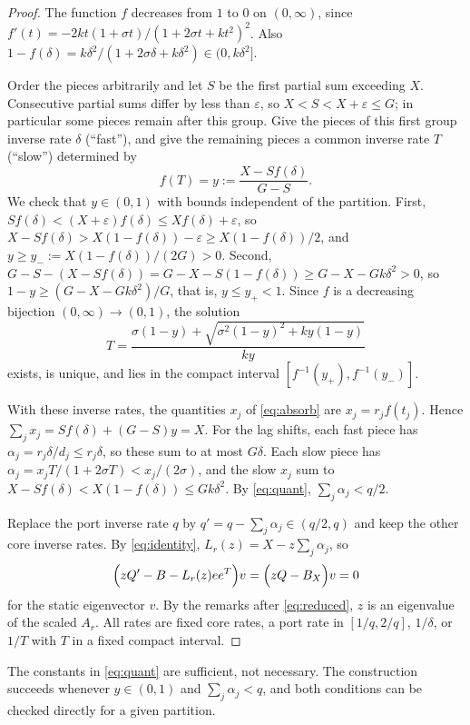 \documentclass[11pt,a4paper]{article}
\theoremstyle{plain}
\theoremstyle{definition}
\theoremstyle{remark}
\begin{document}
\begin{proof}
The function $f$ decreases from $1$ to $0$ on $(0,\infty)$, since
$f'(t)=-2kt(1+\sigma t)/(1+2\sigma t+kt^2)^2$. Also
$1-f(\delta)=k\delta^2/(1+2\sigma\delta+k\delta^2)\in(0,k\delta^2]$.

Order the pieces arbitrarily and let $S$ be the first partial sum exceeding
$X$. Consecutive partial sums differ by less than $\varepsilon$, so
$X<S<X+\varepsilon\le G$; in particular some pieces remain after this group.
Give the pieces of this first group inverse rate $\delta$ (``fast''), and give
the remaining pieces a common inverse rate $T$ (``slow'') determined by
\begin{equation}\label{eq:T}
 f(T)=y:=\frac{X-Sf(\delta)}{G-S}.
\end{equation}
We check that $y\in(0,1)$ with bounds independent of the partition. First,
$Sf(\delta)<(X+\varepsilon)f(\delta)\le Xf(\delta)+\varepsilon$, so
$X-Sf(\delta)>X(1-f(\delta))-\varepsilon\ge X(1-f(\delta))/2$, and
$y\ge y_-:=X(1-f(\delta))/(2G)>0$. Second,
$G-S-(X-Sf(\delta))=G-X-S(1-f(\delta))\ge G-X-Gk\delta^2>0$, so
$1-y\ge(G-X-Gk\delta^2)/G$, that is, $y\le y_+<1$. Since $f$ is a decreasing
bijection $(0,\infty)\to(0,1)$, the solution
\[
 T=\frac{\sigma(1-y)+\sqrt{\sigma^2(1-y)^2+ky(1-y)}}{ky}
\]
exists, is unique, and lies in the compact interval $[f^{-1}(y_+),f^{-1}(y_-)]$.

With these inverse rates, the quantities $x_j$ of \eqref{eq:absorb} are
$x_j=r_jf(t_j)$. Hence $\sum_jx_j=Sf(\delta)+(G-S)y=X$. For the lag shifts,
each fast piece has $\alpha_j=r_j\delta/d_j\le r_j\delta$, so these sum to at
most $G\delta$. Each slow piece has $\alpha_j=x_jT/(1+2\sigma T)<x_j/(2\sigma)$,
and the slow $x_j$ sum to $X-Sf(\delta)<X(1-f(\delta))\le Gk\delta^2$. By
\eqref{eq:quant}, $\sum_j\alpha_j<q/2$.

Replace the port inverse rate $q$ by $q'=q-\sum_j\alpha_j\in(q/2,q)$ and keep the
other core inverse rates. By \eqref{eq:identity},
$L_r(z)=X-z\sum_j\alpha_j$, so
\[
 \Bigl(zQ'-B-L_r(z)ee^{T}\Bigr)v=\Bigl(zQ-B_X\Bigr)v=0
\]
for the static eigenvector $v$. By the remarks after \eqref{eq:reduced}, $z$ is
an eigenvalue of the scaled $A_r$. All
rates are fixed core rates, a port rate in $[1/q,2/q]$, $1/\delta$, or $1/T$ with $T$ in a fixed compact
interval.
\end{proof}

The constants in \eqref{eq:quant} are sufficient, not necessary. The
construction succeeds whenever $y\in(0,1)$ and $\sum_j\alpha_j<q$, and both
conditions can be checked directly for a given partition.
\end{document}

